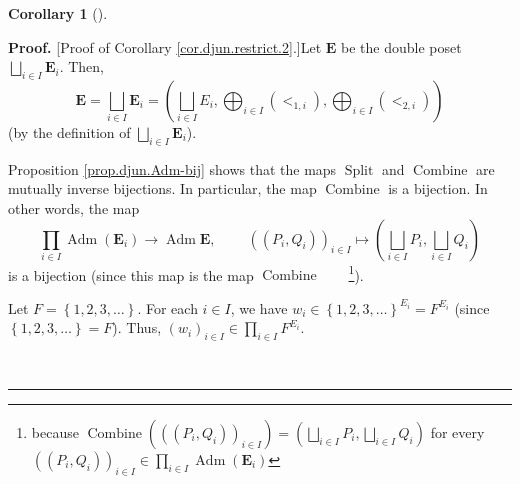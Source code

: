 \documentclass[numbers=enddot,12pt,final,onecolumn,notitlepage,abstracton]{scrartcl}
\theoremstyle{definition}
\newtheorem{coro}[theo]{Corollary}
\newenvironment{corollary}[1][]
{\begin{coro}[#1]\begin{leftbar}}
{\end{leftbar}\end{coro}}
\newenvironment{proof}[1][Proof]{\noindent\textbf{#1.} }{\ \rule{0.5em}{0.5em}}
\let\prodnonlimits\prod
\renewcommand{\prod}{\prodnonlimits\limits}
\newenvironment{verlong}{}{}
\begin{document}
\begin{verlong}
\begin{footnotesize}
\begin{corollary}
\end{corollary}

\begin{proof}
[Proof of Corollary \ref{cor.djun.restrict.2}.]Let $\mathbf{E}$ be the double
poset $\bigsqcup_{i\in I}\mathbf{E}_{i}$. Then,%
\[
\mathbf{E}=\bigsqcup_{i\in I}\mathbf{E}_{i}=\left(  \bigsqcup_{i\in I}%
E_{i},\bigoplus_{i\in I}\left(  <_{1,i}\right)  ,\bigoplus_{i\in I}\left(
<_{2,i}\right)  \right)
\]
(by the definition of $\bigsqcup_{i\in I}\mathbf{E}_{i}$).

Proposition \ref{prop.djun.Adm-bij} shows that the maps $\operatorname*{Split}%
$ and $\operatorname*{Combine}$ are mutually inverse bijections. In
particular, the map $\operatorname*{Combine}$ is a bijection. In other words,
the map%
\begin{equation}
\prod_{i\in I}\operatorname*{Adm}\left(  \mathbf{E}_{i}\right)  \rightarrow
\operatorname*{Adm}\mathbf{E},\ \ \ \ \ \ \ \ \ \ \left(  \left(  P_{i}%
,Q_{i}\right)  \right)  _{i\in I}\mapsto\left(  \bigsqcup_{i\in I}%
P_{i},\bigsqcup_{i\in I}Q_{i}\right)  \label{pf.cor.djun.restrict.2.combine}%
\end{equation}
is a bijection (since this map is the map $\operatorname*{Combine}%
$\ \ \ \ \footnote{because $\operatorname*{Combine}\left(  \left(  \left(
P_{i},Q_{i}\right)  \right)  _{i\in I}\right)  =\left(  \bigsqcup_{i\in
I}P_{i},\bigsqcup_{i\in I}Q_{i}\right)  $ for every $\left(  \left(
P_{i},Q_{i}\right)  \right)  _{i\in I}\in\prod_{i\in I}\operatorname*{Adm}%
\left(  \mathbf{E}_{i}\right)  $}).

Let $F=\left\{  1,2,3,\ldots\right\}  $. For each $i\in I$, we have $w_{i}%
\in\left\{  1,2,3,\ldots\right\}  ^{E_{i}}=F^{E_{i}}$ (since $\left\{
1,2,3,\ldots\right\}  =F$). Thus, $\left(  w_{i}\right)  _{i\in I}\in
\prod_{i\in I}F^{E_{i}}$.


\end{proof}
\end{footnotesize}
\end{verlong}
\end{document}
